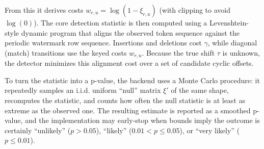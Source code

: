 From this it derives costs $w_{r,u}=\log(1-\xi_{r,u})$ (with clipping to avoid $\log(0)$). The core detection statistic is then computed using a Levenshtein-style dynamic program that aligns the observed token sequence against the periodic watermark row sequence. Insertions and deletions cost $\gamma$, while diagonal (match) transitions use the keyed costs $w_{r,u}$. Because the true shift $\tau$ is unknown, the detector minimizes this alignment cost over a set of candidate cyclic offsets.

To turn the statistic into a p-value, the backend uses a Monte Carlo procedure: it repeatedly samples an i.i.d. uniform ``null'' matrix $\xi'$ of the same shape, recomputes the statistic, and counts how often the null statistic is at least as extreme as the observed one. The resulting estimate is reported as a smoothed p-value, and the implementation may early-stop when bounds imply the outcome is certainly ``unlikely'' ($p > 0.05$), ``likely'' ($0.01 < p \leq 0.05$), or ``very likely'' ($p \leq 0.01$).
